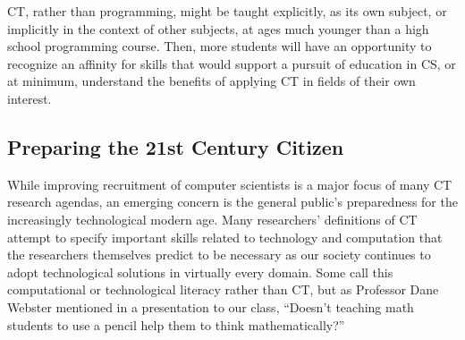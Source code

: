 \documentclass{acm_proc_article-sp}
\begin{document}
CT, rather than programming, might be taught explicitly, as its own subject, or implicitly in the context of other subjects, at ages much younger than a high school programming course.
Then, more students will have an opportunity to recognize an affinity for skills that would support a pursuit of education in CS, or at minimum, understand the benefits of applying CT in fields of their own interest.

\subsection{Preparing the 21st Century Citizen}
\label{sec:citizens}
While improving recruitment of computer scientists is a major focus of many CT research agendas, an emerging concern is the general public's preparedness for the increasingly technological modern age. Many researchers' definitions of CT attempt to specify important skills related to technology and computation that the researchers themselves predict to be necessary as our society continues to adopt technological solutions in virtually every domain. Some call this computational or technological literacy rather than CT, but as Professor Dane Webster mentioned in a presentation to our class, ``Doesn't teaching math students to use a pencil help them to think mathematically?''\cite{webster2013quote}


\end{document}
